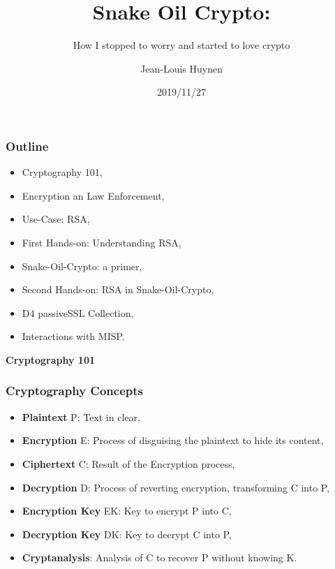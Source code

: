 \documentclass{beamer}
\title{Snake Oil Crypto:}
\subtitle{How I stopped to worry and started to love crypto}
\author{Jean-Louis Huynen}
\institute{Team CIRCL \\ \url{https://www.d4-project.org/}}
\date{2019/11/27}
\begin{document}
    \begin{frame}
        \maketitle
    \end{frame}

\begin{frame}
        \frametitle{Outline}

        \begin{itemize}
          \item Cryptography 101,
          \item Encryption an Law Enforcement,
          \item Use-Case: RSA,
          \item First Hands-on: Understanding RSA,
          \item Snake-Oil-Crypto: a primer,
          \item Second Hands-on: RSA in Snake-Oil-Crypto,
          \item D4 passiveSSL Collection,
          \item Interactions with MISP.
        \end{itemize}

\end{frame}

\begin{frame}
  \begin{center}
    {\bf Cryptography 101}
  \end{center}
\end{frame}


\begin{frame}
  \frametitle{Cryptography Concepts}
        \begin{itemize}
          \item {\bf Plaintext} P: Text in clear,
          \item {\bf Encryption} E: Process of disguising the plaintext to hide its content,
          \item {\bf Ciphertext} C: Result of the Encryption process,
          \item {\bf Decryption} D: Process of reverting encryption, transforming C
            into P,
          \item {\bf Encryption Key} EK: Key to encrypt P into C,
          \item {\bf Decryption Key} DK: Key to decrypt C into P,
          \item {\bf Cryptanalysis}: Analysis of C to recover P without knowing K.
        \end{itemize}

\end{frame}
\end{document}
